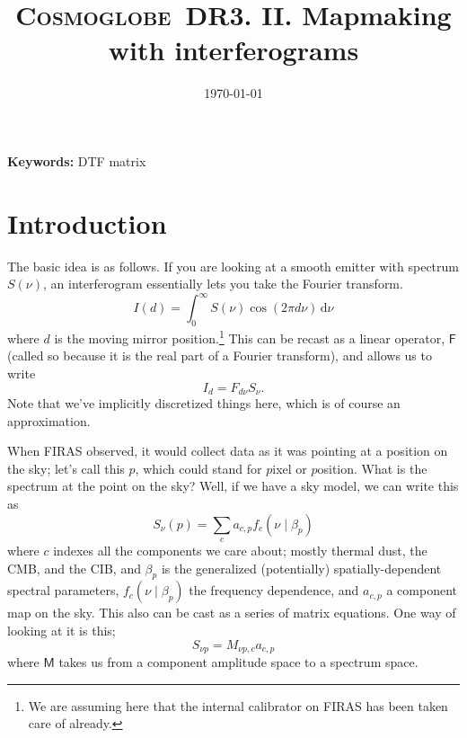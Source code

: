 \documentclass{article}
\def\Cosmoglobe{\textsc{Cosmoglobe}}
\begin{document}
 

   \title{\bfseries{\Cosmoglobe\ DR3. II. Mapmaking with interferograms}}

   

  

   \date{\today} 
   


	\textbf{Keywords:} DTF matrix

   \maketitle

   

\section{Introduction}

The basic idea is as follows. If you are looking at a smooth emitter with spectrum $S(\nu)$, an interferogram essentially lets you take the Fourier transform.
\[
	I(d)=\int_0^\infty S(\nu)\cos(2\pi d\nu)\,\mathrm d\nu
\]
where $d$ is the moving mirror position.\footnote{We are assuming here that the internal calibrator on FIRAS has been taken care of already.} This can be recast as a linear operator, $\mathsf F$ (called so because it is the real part of a Fourier transform), and allows us to write
\[
	I_d = F_{d\nu}S_\nu.
\]
Note that we've implicitly discretized things here, which is of course an approximation.

When FIRAS observed, it would collect data as it was pointing at a position on the sky; let's call this $p$, which could stand for $p$ixel or $p$osition. What is the spectrum at the point on the sky? Well, if we have a sky model, we can write this as
\[
	S_\nu(p)=\sum_c a_{c,p}f_c(\nu\mid\beta_{p})
\]
where $c$ indexes all the components we care about; mostly thermal dust, the CMB, and the CIB, and $\beta_p$ is the generalized (potentially) spatially-dependent spectral parameters, $f_c(\nu\mid\beta_p)$ the frequency dependence, and $a_{c,p}$ a component map on the sky. This also can be cast as a series of matrix equations. One way of looking at it is this;
\[
	S_{\nu p}=M_{\nu p, c}a_{c,p}
\]
where $\mathsf M$ takes us from a component amplitude space to a spectrum space.
\end{document}

